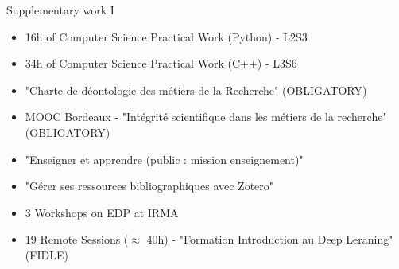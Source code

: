 \begin{frame}{Supplementary work I}
	\small
	\vspace{-5pt}
	\begin{tcolorbox}[
		skin=bicolor,
		colback=other, %
		colbacklower=other!20!white,
		title={Teaching at the university},
		arc=2mm, %
		boxrule=0.5pt, %
		breakable, enhanced jigsaw,
		width=\linewidth,
		opacityback=0.1,
		]
		\begin{itemize}[\textcolor{other}{$\blacktriangleright$}]
			\item 16h of Computer Science Practical Work (Python) - L2S3
			\item 34h of Computer Science Practical Work (C++) - L3S6
		\end{itemize}
	\end{tcolorbox}

	\begin{tcolorbox}[
		skin=bicolor,
		colback=other, %
		colbacklower=other!20!white,
		title={Formations (Total : $\approx 65h$)},
		arc=2mm, %
		boxrule=0.5pt, %
		breakable, enhanced jigsaw,
		width=\linewidth,
		opacityback=0.1
		]
		
		\begin{itemize}[\textcolor{other}{$\blacktriangleright$}]
			\item "Charte de déontologie des métiers de la Recherche" (OBLIGATORY)
			\item MOOC Bordeaux - "Intégrité scientifique dans les métiers de la recherche" (OBLIGATORY)
			\item "Enseigner et apprendre (public : mission enseignement)"
			\item "Gérer ses ressources bibliographiques avec Zotero"
			\item 3 Workshops on EDP at IRMA
			\item 19 Remote Sessions ($\approx$ 40h) - "Formation Introduction au Deep Leraning" (FIDLE)
		\end{itemize} 
	\end{tcolorbox}
\end{frame}


